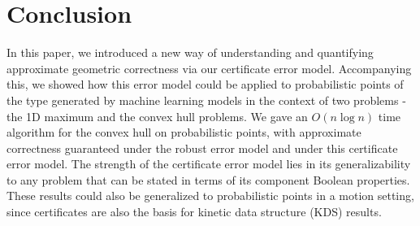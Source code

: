 \documentclass[11pt]{article}
\begin{document}
\section{Conclusion}
In this paper, we introduced a new way of understanding and quantifying approximate geometric correctness via our certificate error model.  Accompanying this, we showed how this error model could be applied to probabilistic points of the type generated by machine learning models in the context of two problems - the 1D maximum and the convex hull problems.  We gave an $O(n \log n)$ time algorithm for the convex hull on probabilistic points, with approximate correctness guaranteed under the robust error model and under this certificate error model.  The strength of the certificate error model lies in its generalizability to any problem that can be stated in terms of its component Boolean properties.  These results could also be generalized to probabilistic points in a motion setting, since certificates are also the basis for kinetic data structure (KDS) results.




\end{document}
